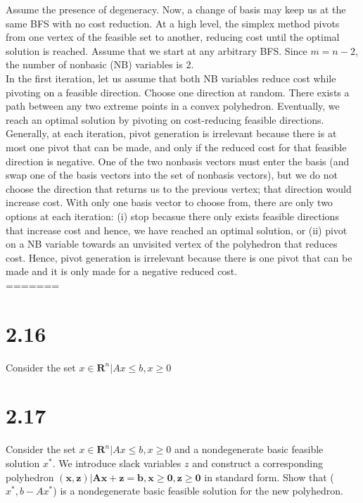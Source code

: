 \documentclass{article}
\begin{document}
\noindent
Assume the presence of degeneracy.  Now, a change of basis may keep us at the same BFS with no cost reduction.  At a high level, the simplex method pivots from one vertex of the feasible set to another, reducing cost until the optimal solution is reached.  Assume that we start at any arbitrary BFS.  Since $m = n-2$, the number of nonbasic (NB) variables is 2.\\

\noindent
In the first iteration, let us assume that both NB variables reduce cost while pivoting on a feasible direction.  Choose one direction at random.  There exists a path between any two extreme points in a convex polyhedron.  Eventually, we reach an optimal solution by pivoting on cost-reducing feasible directions.  \\

\noindent
Generally, at each iteration, pivot generation is irrelevant because there is at most one pivot that can be made, and only if the reduced cost for that feasible direction is negative.  One of the two nonbasis vectors must enter the basis (and swap one of the basis vectors into the set of nonbasis vectors), but we do not choose the direction that returns us to the previous vertex;  that direction would increase cost.  With only one basis vector to choose from, there are only two options at each iteration:  (i) stop becasue there only exists feasible directions that increase cost and hence, we have reached an optimal solution, or (ii) pivot on a NB variable towards an unvisited vertex of the polyhedron that reduces cost. Hence, pivot generation is irrelevant because there is one pivot that can be made and it is only made for a negative reduced cost.  \\
=======
\maketitle

\section{2.16}
Consider the set {$x \in \mathbf{R}^n | Ax \leq b, x \geq 0$} 

\section{2.17}
Consider the set {$x \in \mathbf{R}^n | Ax \leq b, x \geq 0$} and a nondegenerate basic feasible solution $x^*$.  We introduce slack variables $z$ and construct a corresponding polyhedron {$\mathbf{(x,z) | Ax + z = b, x \geq 0, z \geq 0}$} in standard form.  Show that ($x^*, b-Ax^*$) is a nondegenerate basic feasible solution for the new polyhedron.
\end{document}
